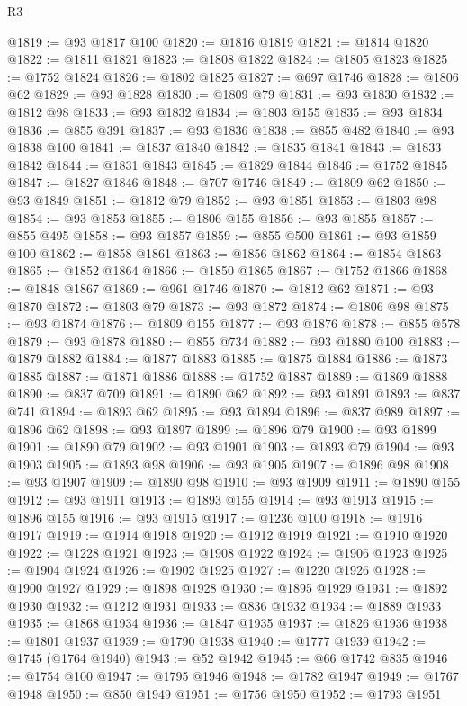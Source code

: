 \begin{lexlean}{R3}
\begin{coremodule}
@1819 := @93 @1817 @100
@1820 := @1816 @1819
@1821 := @1814 @1820
@1822 := @1811 @1821
@1823 := @1808 @1822
@1824 := @1805 @1823
@1825 := @1752 @1824
@1826 := @1802 @1825
@1827 := @697 @1746
@1828 := @1806 @62
@1829 := @93 @1828
@1830 := @1809 @79
@1831 := @93 @1830
@1832 := @1812 @98
@1833 := @93 @1832
@1834 := @1803 @155
@1835 := @93 @1834
@1836 := @855 @391
@1837 := @93 @1836
@1838 := @855 @482
@1840 := @93 @1838 @100
@1841 := @1837 @1840
@1842 := @1835 @1841
@1843 := @1833 @1842
@1844 := @1831 @1843
@1845 := @1829 @1844
@1846 := @1752 @1845
@1847 := @1827 @1846
@1848 := @707 @1746
@1849 := @1809 @62
@1850 := @93 @1849
@1851 := @1812 @79
@1852 := @93 @1851
@1853 := @1803 @98
@1854 := @93 @1853
@1855 := @1806 @155
@1856 := @93 @1855
@1857 := @855 @495
@1858 := @93 @1857
@1859 := @855 @500
@1861 := @93 @1859 @100
@1862 := @1858 @1861
@1863 := @1856 @1862
@1864 := @1854 @1863
@1865 := @1852 @1864
@1866 := @1850 @1865
@1867 := @1752 @1866
@1868 := @1848 @1867
@1869 := @961 @1746
@1870 := @1812 @62
@1871 := @93 @1870
@1872 := @1803 @79
@1873 := @93 @1872
@1874 := @1806 @98
@1875 := @93 @1874
@1876 := @1809 @155
@1877 := @93 @1876
@1878 := @855 @578
@1879 := @93 @1878
@1880 := @855 @734
@1882 := @93 @1880 @100
@1883 := @1879 @1882
@1884 := @1877 @1883
@1885 := @1875 @1884
@1886 := @1873 @1885
@1887 := @1871 @1886
@1888 := @1752 @1887
@1889 := @1869 @1888
@1890 := @837 @709
@1891 := @1890 @62
@1892 := @93 @1891
@1893 := @837 @741
@1894 := @1893 @62
@1895 := @93 @1894
@1896 := @837 @989
@1897 := @1896 @62
@1898 := @93 @1897
@1899 := @1896 @79
@1900 := @93 @1899
@1901 := @1890 @79
@1902 := @93 @1901
@1903 := @1893 @79
@1904 := @93 @1903
@1905 := @1893 @98
@1906 := @93 @1905
@1907 := @1896 @98
@1908 := @93 @1907
@1909 := @1890 @98
@1910 := @93 @1909
@1911 := @1890 @155
@1912 := @93 @1911
@1913 := @1893 @155
@1914 := @93 @1913
@1915 := @1896 @155
@1916 := @93 @1915
@1917 := @1236 @100
@1918 := @1916 @1917
@1919 := @1914 @1918
@1920 := @1912 @1919
@1921 := @1910 @1920
@1922 := @1228 @1921
@1923 := @1908 @1922
@1924 := @1906 @1923
@1925 := @1904 @1924
@1926 := @1902 @1925
@1927 := @1220 @1926
@1928 := @1900 @1927
@1929 := @1898 @1928
@1930 := @1895 @1929
@1931 := @1892 @1930
@1932 := @1212 @1931
@1933 := @836 @1932
@1934 := @1889 @1933
@1935 := @1868 @1934
@1936 := @1847 @1935
@1937 := @1826 @1936
@1938 := @1801 @1937
@1939 := @1790 @1938
@1940 := @1777 @1939
@1942 := @1745 (@1764 @1940)
@1943 := @52 @1942
@1945 := @66 @1742 @835
@1946 := @1754 @100
@1947 := @1795 @1946
@1948 := @1782 @1947
@1949 := @1767 @1948
@1950 := @850 @1949
@1951 := @1756 @1950
@1952 := @1793 @1951

\end{coremodule}
\end{lexlean}
